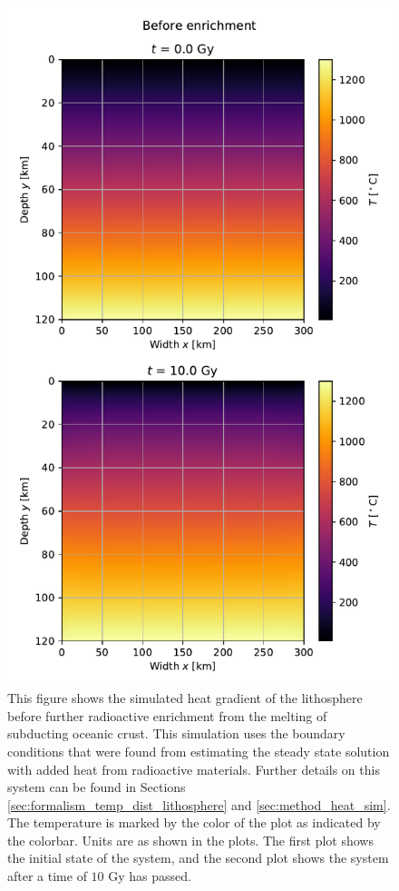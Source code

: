 \documentclass[reprint,english,notitlepage]{revtex4-1}  %
\begin{document}
\begin{figure}[H]
\centering
\includegraphics[width=\columnwidth]{../data/2D_heat_before.pdf}
\caption{This figure shows the simulated heat gradient of the lithosphere before further radioactive enrichment from the melting of subducting oceanic crust. This simulation uses the boundary conditions that were found from estimating the steady state solution with added heat from radioactive materials. Further details on this system can be found in Sections \ref{sec:formalism_temp_dist_lithosphere} and \ref{sec:method_heat_sim}. The temperature is marked by the color of the plot as indicated by the colorbar. Units are as shown in the plots. The first plot shows the initial state of the system, and the second plot shows the system after a time of $10$ Gy has passed.} \label{fig:lithosphere_before_enrichment}
\end{figure}
\end{document}
